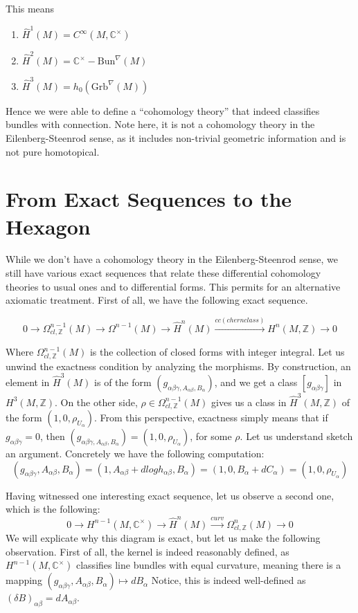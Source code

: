 \documentclass[10pt]{amsart}
\newcommand{\bC}{\mathbb{C}}
\newcommand{\bZ}{\mathbb{Z}}
\newcommand{\Bun}{\mathrm{Bun}}
\newcommand{\Grb}{\mathrm{Grb}}
\newcommand{\nrnote}[1]{\todo[color=green!40,linecolor=green!40!black,size=\tiny]{#1}}
\begin{document}
This means
\begin{enumerate}
	\item $\hat{H}^1(M) = C^\infty(M,\bC^\times)$
	\item $\hat{H}^2(M) = \bC^\times - \Bun^\nabla(M)$
	\item $\hat{H}^3(M) = h_0(\Grb^\nabla(M))$ 
\end{enumerate}

Hence we were able to define a ``cohomology theory'' that indeed classifies bundles with connection. Note here, it is not a cohomology theory in the Eilenberg-Steenrod sense, as it includes non-trivial geometric information and is not pure homotopical. 

\section{From Exact Sequences to the Hexagon}
While we don't have a cohomology theory in the Eilenberg-Steenrod sense, we still have various exact sequences that relate these differential cohomology theories to usual ones and to differential forms. This permits for an alternative axiomatic treatment. First of all, we have the following exact sequence.

\[ 0 \to \Omega^{n-1}_{cl,\bZ}(M) \to \Omega^{n-1}(M) \to \hat{H}^n(M) \xrightarrow{cc (chern class)} H^n(M,\bZ) \to 0\]

Where $\Omega^{n-1}_{cl,\bZ}(M)$ is the collection of closed forms with integer integral. Let us unwind the exactness condition by analyzing the morphisms. By construction, an element in $\hat{H}^3(M)$ is of the form $(g_{\alpha\beta\gamma, A_{\alpha\beta},B_\alpha})$, and we get a class $[g_{\alpha\beta\gamma}]$ in $H^3(M,\bZ)$. On the other side, $\rho \in \Omega^{n-1}_{cl,\bZ}(M)$ gives us a class in $\hat{H}^3(M,\bZ)$ of the form $(1, 0, \rho_{U_\alpha})$. From this perspective, exactness simply means that if $g_{\alpha\beta\gamma} = 0$, then $(g_{\alpha\beta\gamma, A_{\alpha\beta},B_\alpha}) = (1, 0, \rho_{U_\alpha})$, for some $\rho$. Let us understand sketch an argument. Concretely we have the following computation:
\[ (g_{\alpha\beta\gamma}, A_{\alpha\beta}, B_\alpha) =  (1, A_{\alpha\beta} + d log h_{\alpha\beta}, B_\alpha) = (1, 0 , B_\alpha + d C_\alpha) = (1, 0, \rho_{U_\alpha}) \]

Having witnessed one interesting exact sequence, let us observe a second one, which is the following:
\[ 0 \to H^{n-1}(M, \bC^\times) \to \hat{H}^n(M) \xrightarrow{curv} \Omega_{cl,\bZ}^n(M)\to 0 \]
We will explicate why this diagram is exact, but let us make the following observation. First of all, the kernel is indeed reasonably defined, as $H^{n-1}(M, \bC^\times)$ classifies line bundles with equal curvature, meaning there is a mapping $(g_{\alpha\beta\gamma}, A_{\alpha\beta}, B_\alpha) \mapsto d B_\alpha$  Notice, this is indeed well-defined as $(\delta B)_{\alpha\beta} = d A_{\alpha\beta}$.\nrnote{How does that relate to the previous step?}
\end{document}
